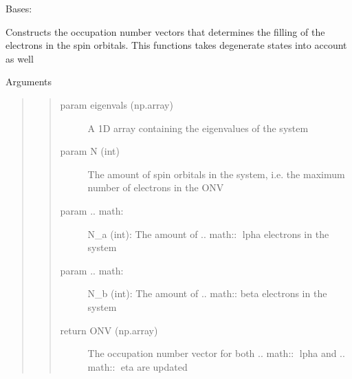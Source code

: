 \documentclass[letterpaper,10pt,english]{sphinxmanual}
\begin{document}
\begin{fulllineitems}
\label{\detokenize{modules/gqcml.data_generators:gqcml.data_generators.Huckel.HuckelSolver}}
Bases: 

\begin{fulllineitems}
\label{\detokenize{modules/gqcml.data_generators:gqcml.data_generators.Huckel.HuckelSolver.ONV}}
Constructs the occupation number vectors that determines the filling of the electrons in the
spin orbitals. This functions takes degenerate states into account as well

Arguments
\begin{quote}
\begin{quote}\begin{description}
\item[{param eigenvals (np.array)}] \leavevmode
A 1D array containing the eigenvalues of the system

\item[{param N (int)}] \leavevmode
The amount of spin orbitals in the system, i.e. the maximum number
of electrons in the ONV

\item[{param .. math:}] \leavevmode
N\_a (int): The amount of .. math:: lpha electrons in the system

\item[{param .. math:}] \leavevmode
N\_b (int): The amount of .. math:: beta electrons in the system

\item[{return ONV (np.array)}] \leavevmode
The occupation number vector for both .. math:: lpha and .. math:: eta are updated

\end{description}\end{quote}
\end{quote}

\end{fulllineitems}



\end{fulllineitems}
\end{document}

